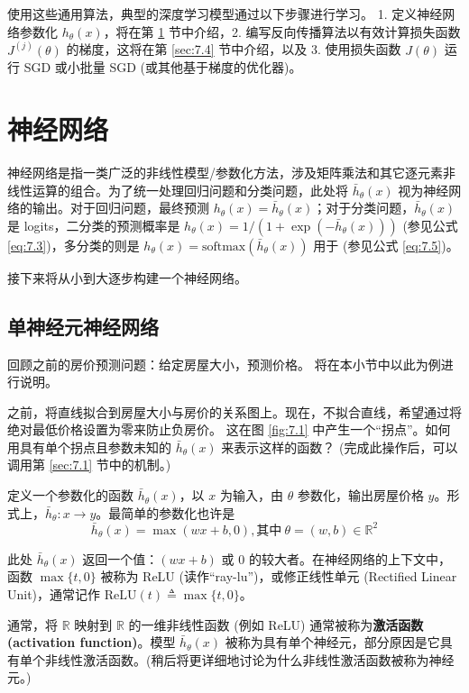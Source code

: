 使用这些通用算法，典型的深度学习模型通过以下步骤进行学习。 1. 定义神经网络参数化 $h_\theta(x)$，将在第 \ref{sec:7.2} 节中介绍，2. 编写反向传播算法以有效计算损失函数 $J^{(j)}(\theta)$ 的梯度，这将在第 \ref{sec:7.4} 节中介绍，以及 3. 使用损失函数 $J(\theta)$ 运行 SGD 或小批量 SGD (或其他基于梯度的优化器)。

\section{神经网络}\label{sec:7.2}

神经网络是指一类广泛的非线性模型/参数化方法，涉及矩阵乘法和其它逐元素非线性运算的组合。为了统一处理回归问题和分类问题，此处将 $\bar{h}_\theta(x)$ 视为神经网络的输出。对于回归问题，最终预测 $h_\theta(x) = \bar{h}_\theta(x)$；对于分类问题，$\bar{h}_\theta(x)$ 是 logits，二分类的预测概率是 $h_\theta(x) = 1/(1+\exp(-\bar{h}_\theta(x)))$ (参见公式 \eqref{eq:7.3})，多分类的则是 $h_\theta(x) = \text{softmax}(\bar{h}_\theta(x))$ 用于 (参见公式 \eqref{eq:7.5})。

接下来将从小到大逐步构建一个神经网络。

\subsection*{单神经元神经网络}

回顾之前的房价预测问题：给定房屋大小，预测价格。 将在本小节中以此为例进行说明。

之前，将直线拟合到房屋大小与房价的关系图上。现在，不拟合直线，希望通过将绝对最低价格设置为零来防止负房价。 这在图 \ref{fig:7.1} 中产生一个“拐点”。如何用具有单个拐点且参数未知的 $\bar{h}_\theta(x)$ 来表示这样的函数？ (完成此操作后，可以调用第 \ref{sec:7.1} 节中的机制。)

定义一个参数化的函数 $\bar{h}_\theta(x)$，以 $x$ 为输入，由 $\theta$ 参数化，输出房屋价格 $y$。形式上，$\bar{h}_\theta: x \to y$。最简单的参数化也许是
\begin{equation}
    \bar{h}_\theta(x) = \max(wx + b, 0), \text{其中}\  \theta = (w, b) \in \mathbb{R}^2
    \label{eq:7.11}
\end{equation}

此处 $\bar{h}_\theta(x)$ 返回一个值：$(wx+b)$ 或 0 的较大者。在神经网络的上下文中，函数 $\max\{t, 0\}$ 被称为 ReLU (读作“ray-lu”)，或修正线性单元 (Rectified Linear Unit)，通常记作 $\text{ReLU}(t) \triangleq \max\{t, 0\}$。

通常，将 $\mathbb{R}$ 映射到 $\mathbb{R}$ 的一维非线性函数 (例如 ReLU) 通常被称为\textbf{激活函数 (activation function)}。模型 $\bar{h}_\theta(x)$ 被称为具有单个神经元，部分原因是它具有单个非线性激活函数。(稍后将更详细地讨论为什么非线性激活函数被称为神经元。)

